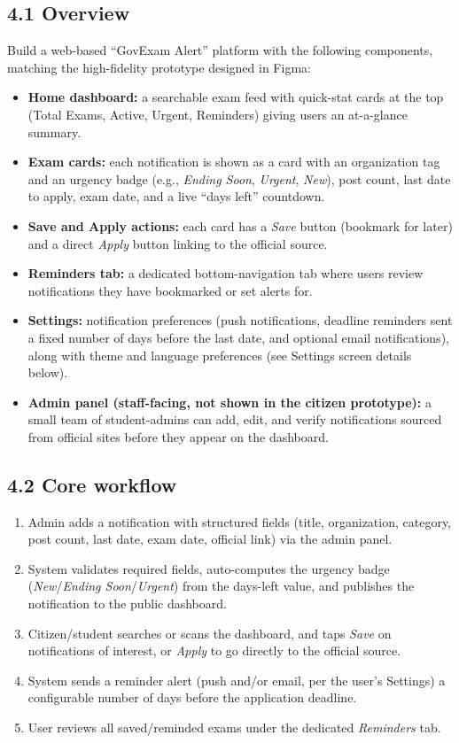 \documentclass[11pt,a4paper]{article}
\begin{document}
\subsection*{4.1 Overview}
Build a web-based ``GovExam Alert'' platform with the following components,
matching the high-fidelity prototype designed in Figma:
\begin{itemize}[leftmargin=1.5em]
  \item \textbf{Home dashboard:} a searchable exam feed with quick-stat cards
  at the top (Total Exams, Active, Urgent, Reminders) giving users an
  at-a-glance summary.
  \item \textbf{Exam cards:} each notification is shown as a card with an
  organization tag and an urgency badge (e.g., \emph{Ending Soon}, \emph{Urgent},
  \emph{New}), post count, last date to apply, exam date, and a live
  ``days left'' countdown.
  \item \textbf{Save and Apply actions:} each card has a \emph{Save} button
  (bookmark for later) and a direct \emph{Apply} button linking to the
  official source.
  \item \textbf{Reminders tab:} a dedicated bottom-navigation tab where users
  review notifications they have bookmarked or set alerts for.
  \item \textbf{Settings:} notification preferences (push notifications,
  deadline reminders sent a fixed number of days before the last date, and
  optional email notifications), along with theme and language preferences
  (see Settings screen details below).
  \item \textbf{Admin panel (staff-facing, not shown in the citizen prototype):}
  a small team of student-admins can add, edit, and verify notifications
  sourced from official sites before they appear on the dashboard.
\end{itemize}

\subsection*{4.2 Core workflow}
\begin{enumerate}[leftmargin=1.5em]
  \item Admin adds a notification with structured fields (title, organization,
  category, post count, last date, exam date, official link) via the admin
  panel.
  \item System validates required fields, auto-computes the urgency badge
  (\emph{New}/\emph{Ending Soon}/\emph{Urgent}) from the days-left value, and
  publishes the notification to the public dashboard.
  \item Citizen/student searches or scans the dashboard, and taps \emph{Save}
  on notifications of interest, or \emph{Apply} to go directly to the
  official source.
  \item System sends a reminder alert (push and/or email, per the user's
  Settings) a configurable number of days before the application deadline.
  \item User reviews all saved/reminded exams under the dedicated
  \emph{Reminders} tab.
\end{enumerate}
\end{document}
